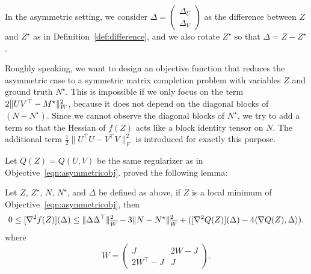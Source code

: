 In the asymmetric setting, we consider $\Delta=\begin{pmatrix}
 \Delta_U\\
 \Delta_V
\end{pmatrix}$ as the difference between $Z$ and $Z^\star$ as in Definition~\ref{def:difference}, and we also rotate $Z^\star$ so that $\Delta = Z-Z^\star$.

Roughly speaking, we want to design an objective function that reduces the asymmetric case to a symmetric matrix completion problem with variables $Z$ and ground truth $N^\star$.
This is impossible if we only focus on the term $2 \|UV^\top - M^\star\|_W^2$, because it does not depend on the diagonal blocks of $(N - N^\star)$.
Since we cannot observe the diagonal blocks of $N^\star$, we try to add a term so that the Hessian of $f(Z)$ acts like a block identity tensor on $N$.
The additional term $\frac{1}{2} \|U^\top U-V^\top V\|_F^2$ is introduced for exactly this purpose.
%

Let $Q(Z) = Q(U,V)$ be the same regularizer as in Objective~\eqref{eqn:asymmetricobj}. \cite{GeJZ17} proved the following lemma:

\begin{lemma}
\label{lem:gjzmain_asym}
Let $Z$, $Z^\star$, $N$, $N^\star$, and $\Delta$ be defined as above, if $Z$ is a local minimum of Objective~\eqref{eqn:asymmetricobj}, then
\[
0 \le [\nabla^2 f(Z)](\Delta) \le \|\Delta\Delta^\top\|_{\overline{W}}^2 - 3\|N-N^\star\|_{\overline{W}}^2 + ([\nabla^2 Q(Z)](\Delta) -4\langle \nabla Q(Z),\Delta\rangle).
\]
where
\[
\bar{W} = \begin{pmatrix}
J & 2W - J \\
2W^\top - J & J
\end{pmatrix}.
\]
\end{lemma}

